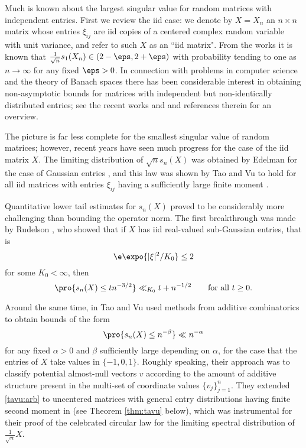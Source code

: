 \documentclass[aop,preprint]{imsart}
\theoremstyle{plain}
\theoremstyle{definition}
\theoremstyle{remark}
\numberwithin{equation}{section}
\numberwithin{theorem}{section}
\begin{document}
Much is known about the largest singular value for random matrices with independent entries.
First we review the iid case: we denote by $X=X_n$ an $n\times n$ matrix whose entries $\xi_{ij}$ are iid copies of a centered complex random variable with unit variance, and refer to such $X$ as an ``iid matrix".
From the works \citep{BSY:largestsv, BKY:largestsv} it is known that $\frac{1}{\sqrt{n}}s_1(X_n)\in (2-\eps,2+\eps)$ with probability tending to one as $n\to \infty$ for any fixed $\eps>0$.
In connection with problems in computer science and the theory of Banach spaces there has been considerable interest in obtaining non-asymptotic bounds for matrices with independent but non-identically distributed entries; see the recent works \citep{BaHa} and \citep{vanHandel:norm} and references therein for an overview. 

The picture is far less complete for the smallest singular value of random matrices; however, recent years have seen much progress for the case of the iid matrix $X$.
The limiting distribution of $\sqrt{n}s_n(X)$ was obtained by Edelman for the case of Gaussian entries \citep{Edelman:condition}, and this law was shown by Tao and Vu to hold for all iid matrices with entries $\xi_{ij}$ having a sufficiently large finite moment \citep{TaVu:ssv}.

Quantitative lower tail estimates for $s_n(X)$ proved to be considerably more challenging than bounding the operator norm.
The first breakthrough was made by Rudelson \citep{Rudelson:inv}, who showed that if $X$ has iid real-valued sub-Gaussian entries, that is
\begin{equation}	\label{subgaussian}
\e \expo{ |\xi|^2/K_0}\le 2
\end{equation}
for some $K_0<\infty$,
then
\begin{equation}	\label{bd:rudelson}
\pro{ s_n(X) \le tn^{-3/2}} \ll_{K_0} t + n^{-1/2}\qquad \text{for all $t\ge 0$}.
\end{equation}


Around the same time, in \cite{TaVu:cond} Tao and Vu used methods from additive combinatorics to obtain bounds of the form
\begin{equation}	\label{tavu:arb}
\pro{ s_n(X) \le n^{-\beta}} \ll n^{-\alpha}
\end{equation}
for any fixed $\alpha>0$ and $\beta$ sufficiently large depending on $\alpha$, for the case that the entries of $X$ take values in $\{-1,0,1\}$. 
Roughly speaking, their approach was to classify potential almost-null vectors $v$ according to the amount of additive structure present in the multi-set of coordinate values $\{v_j\}_{j=1}^n$. 
They extended \eqref{tavu:arb} to uncentered matrices with general entry distributions having finite second moment in \cite{TaVu:circ} (see Theorem \ref{thm:tavu} below), which was instrumental for their proof of %
the celebrated circular law for the limiting spectral distribution of $\frac{1}{\sqrt{n}}X$. 
\end{document}
